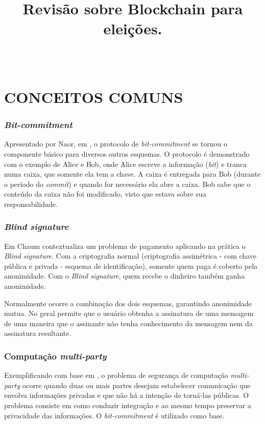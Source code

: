 \documentclass[letterpaper, 12 pt, conference]{ieeeconf}
\title{\LARGE \bf
Revisão sobre Blockchain para eleições.
}
\author{\\%
}
\begin{document}
\maketitle
\thispagestyle{empty}
\pagestyle{empty}

\chapter{\textbf{CONCEITOS COMUNS}}
    \subsection{\textit{Bit-commitment}}
        Apresentado por Naor, em \cite{naor1991bit}, o protocolo de \textit{bit-commitment} se tornou o componente básico para diversos outros esquemas. O protocolo é demonstrado com o exemplo de Alice e Bob, onde  Alice escreve a informação (\textit{bit}) e tranca numa caixa, que somente ela tem a chave. A caixa é entregada para Bob (durante o período do \textit{commit}) e quando for necessário ela abre a caixa. Bob sabe que o conteúdo da caixa não foi modificado, visto que estava sobre sua responsabilidade. 
        
        
        
    \subsection{\textit{Blind signature}}
        Em \cite{chaum1984blind} Chaum contextualiza um problema de pagamento aplicando na prática o \textit{Blind signature}. Com a criptografia normal (criptografia assimétrica - com chave pública e privada - esquema de identificação), somente quem paga é coberto pela anonimidade. Com o \textit{Blind signature}, quem recebe o dinheiro também ganha anonimidade. 
        
        Normalmente ocorre a combinação dos dois esquemas, garantindo anonimidade mutua. No geral permite que o usuário obtenha a assinatura de uma mensagem de uma maneira que o assinante não tenha conhecimento da mensagem nem da assinatura resultante. 
        
    \subsection{ Computação \textit{multi-party}}
        Exemplificando com base em \cite{Du:2001:SMC:508171.508174}, o problema de segurança de computação \textit{multi-party} ocorre quando duas ou mais partes desejam estabelecer comunicação que envolva informações privadas e que não há a intenção de torná-las públicas. O problema consiste em como conduzir integração e ao mesmo tempo preservar a privacidade das informações. O \textit{bit-commitment} é utilizado como base.
        
\end{document}
